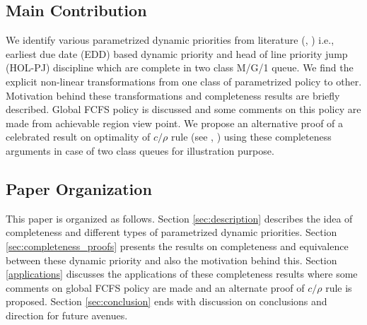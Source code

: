 \documentclass[a4paper,12pt]{article}
\begin{document}
\subsection{Main Contribution}     
We identify various parametrized dynamic priorities from literature (\cite{EDDpriority}, \cite{holpj}) i.e., earliest due date (EDD) based dynamic priority and head of line priority jump (HOL-PJ) discipline which are complete in two class M/G/1 queue. We find the explicit non-linear transformations from one class of parametrized policy to other. Motivation behind these transformations and completeness results are briefly described. Global FCFS policy is discussed and some comments on this policy are made from achievable region view point. We propose an alternative proof of a celebrated result on optimality of $c/\rho$ rule (see \cite{yao2002dynamic}, \cite{mitranibook}) using these completeness arguments in case of two class queues for illustration purpose.  


\subsection{Paper Organization}
This paper is organized as follows. Section \ref{sec:description} describes the idea of completeness and different types of parametrized dynamic priorities. Section \ref{sec:completeness_proofs} presents the results on completeness and equivalence between these dynamic priority and also the motivation behind this. Section \ref{applications} discusses the applications of these completeness results where some comments on global FCFS policy are made and an alternate proof of $c/\rho$ rule is proposed. Section \ref{sec:conclusion} ends with discussion on conclusions and direction for future avenues.
\end{document}

